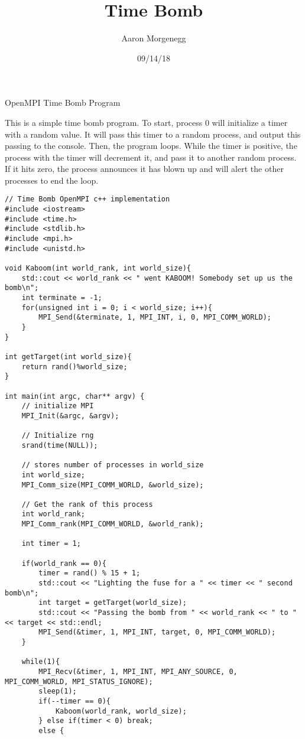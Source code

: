 \documentclass[12pt]{article}
\title{Time Bomb}
\author{Aaron Morgenegg}
\date{09/14/18}
\begin{document}
\maketitle

OpenMPI Time Bomb Program

This is a simple time bomb program. To start, process 0 will initialize a timer with a random value. It will pass this timer to a random process, and output this passing to the console. Then, the program loops. While the timer is positive, the process with the timer will decrement it, and pass it to another random process. If it hits zero, the process announces it has blown up and will alert the other processes to end the loop.

\begin{verbatim}
// Time Bomb OpenMPI c++ implementation
#include <iostream>
#include <time.h>
#include <stdlib.h>
#include <mpi.h>
#include <unistd.h>

void Kaboom(int world_rank, int world_size){
	std::cout << world_rank << " went KABOOM! Somebody set up us the bomb\n";
	int terminate = -1;
	for(unsigned int i = 0; i < world_size; i++){
		MPI_Send(&terminate, 1, MPI_INT, i, 0, MPI_COMM_WORLD);
	}
}

int getTarget(int world_size){
	return rand()%world_size;
}

int main(int argc, char** argv) {
	// initialize MPI
	MPI_Init(&argc, &argv);

	// Initialize rng
	srand(time(NULL));

	// stores number of processes in world_size
	int world_size;
	MPI_Comm_size(MPI_COMM_WORLD, &world_size);

	// Get the rank of this process
	int world_rank;
	MPI_Comm_rank(MPI_COMM_WORLD, &world_rank);
	
	int timer = 1;

	if(world_rank == 0){
		timer = rand() % 15 + 1;
		std::cout << "Lighting the fuse for a " << timer << " second bomb\n";
		int target = getTarget(world_size);
		std::cout << "Passing the bomb from " << world_rank << " to " << target << std::endl;
		MPI_Send(&timer, 1, MPI_INT, target, 0, MPI_COMM_WORLD);
	}

	while(1){
		MPI_Recv(&timer, 1, MPI_INT, MPI_ANY_SOURCE, 0, MPI_COMM_WORLD, MPI_STATUS_IGNORE);
		sleep(1);
		if(--timer == 0){
			Kaboom(world_rank, world_size);
		} else if(timer < 0) break;
		else {
\end{verbatim}
\end{document}
